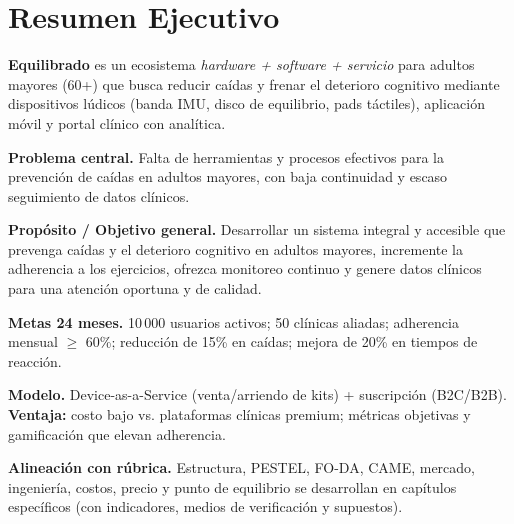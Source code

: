 \section{Resumen Ejecutivo}
\textbf{Equilibrado} es un ecosistema \emph{hardware + software + servicio} para adultos mayores (60+) que busca reducir caídas y frenar el deterioro cognitivo mediante dispositivos lúdicos (banda IMU, disco de equilibrio, pads táctiles), aplicación móvil y portal clínico con analítica. 
\medskip

\textbf{Problema central.} Falta de herramientas y procesos efectivos para la prevención de caídas en adultos mayores, con baja continuidad y escaso seguimiento de datos clínicos.

\textbf{Propósito / Objetivo general.} Desarrollar un sistema integral y accesible que prevenga caídas y el deterioro cognitivo en adultos mayores, incremente la adherencia a los ejercicios, ofrezca monitoreo continuo y genere datos clínicos para una atención oportuna y de calidad.

\textbf{Metas 24 meses.} 10\,000 usuarios activos; 50 clínicas aliadas; adherencia mensual $\geq$ 60\%; reducción de 15\% en caídas; mejora de 20\% en tiempos de reacción.

\textbf{Modelo.} Device-as-a-Service (venta/arriendo de kits) + suscripción (B2C/B2B). \textbf{Ventaja:} costo bajo vs. plataformas clínicas premium; métricas objetivas y gamificación que elevan adherencia.

\textbf{Alineación con rúbrica.} Estructura, PESTEL, FO-DA, CAME, mercado, ingeniería, costos, precio y punto de equilibrio se desarrollan en capítulos específicos (con indicadores, medios de verificación y supuestos). %

